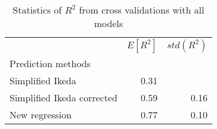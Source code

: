 
\begin{table}[H]
    \centering
    \caption{Statistics of $R^2$ from cross validations with all models}
   \begin{tabular}{lrr}
\toprule
{} &  $E[R^2]$ &  $std(R^2)$ \\
Prediction methods                      &              &             \\
\midrule
Simplified Ikeda           &         0.31 &             \\
Simplified Ikeda corrected &         0.59 &        0.16 \\
New regression             &         0.77 &        0.10 \\
\bottomrule
\end{tabular}

    \label{tab:crossvalidation}
\end{table}
    